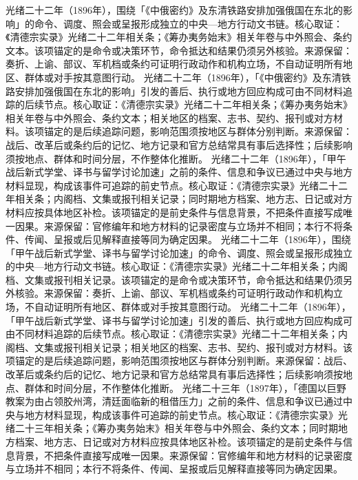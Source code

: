 光绪二十二年（1896年），围绕「《中俄密约》及东清铁路安排加强俄国在东北的影响」的命令、调度、照会或呈报形成独立的中央—地方行动文书链。核心取证：《清德宗实录》光绪二十二年相关条；《筹办夷务始末》相关年卷与中外照会、条约文本。该项锚定的是命令或决策环节，命令抵达和结果仍须另外核验。来源保留：奏折、上谕、部议、军机档或条约可证明行政动作和机构立场，不自动证明所有地区、群体或对手按其意图行动。
光绪二十二年（1896年），「《中俄密约》及东清铁路安排加强俄国在东北的影响」引发的善后、执行或地方回应构成可由不同材料追踪的后续节点。核心取证：《清德宗实录》光绪二十二年相关条；《筹办夷务始末》相关年卷与中外照会、条约文本；相关地区的档案、志书、契约、报刊或对方材料。该项锚定的是后续追踪问题，影响范围须按地区与群体分别判断。来源保留：战后、改革后或条约后的记忆、地方记录和官方总结常具有事后选择性；后续影响须按地点、群体和时间分层，不作整体化推断。
光绪二十二年（1896年），「甲午战后新式学堂、译书与留学讨论加速」之前的条件、信息和争议已通过中央与地方材料显现，构成该事件可追踪的前史节点。核心取证：《清德宗实录》光绪二十二年相关条；内阁档、文集或报刊相关记录；同时期地方档案、地方志、日记或对方材料应按具体地区补检。该项锚定的是前史条件与信息背景，不把条件直接写成唯一因果。来源保留：官修编年和地方材料的记录密度与立场并不相同；本行不将条件、传闻、呈报或后见解释直接等同为确定因果。
光绪二十二年（1896年），围绕「甲午战后新式学堂、译书与留学讨论加速」的命令、调度、照会或呈报形成独立的中央—地方行动文书链。核心取证：《清德宗实录》光绪二十二年相关条；内阁档、文集或报刊相关记录。该项锚定的是命令或决策环节，命令抵达和结果仍须另外核验。来源保留：奏折、上谕、部议、军机档或条约可证明行政动作和机构立场，不自动证明所有地区、群体或对手按其意图行动。
光绪二十二年（1896年），「甲午战后新式学堂、译书与留学讨论加速」引发的善后、执行或地方回应构成可由不同材料追踪的后续节点。核心取证：《清德宗实录》光绪二十二年相关条；内阁档、文集或报刊相关记录；相关地区的档案、志书、契约、报刊或对方材料。该项锚定的是后续追踪问题，影响范围须按地区与群体分别判断。来源保留：战后、改革后或条约后的记忆、地方记录和官方总结常具有事后选择性；后续影响须按地点、群体和时间分层，不作整体化推断。
光绪二十三年（1897年），「德国以巨野教案为由占领胶州湾，清廷面临新的租借压力」之前的条件、信息和争议已通过中央与地方材料显现，构成该事件可追踪的前史节点。核心取证：《清德宗实录》光绪二十三年相关条；《筹办夷务始末》相关年卷与中外照会、条约文本；同时期地方档案、地方志、日记或对方材料应按具体地区补检。该项锚定的是前史条件与信息背景，不把条件直接写成唯一因果。来源保留：官修编年和地方材料的记录密度与立场并不相同；本行不将条件、传闻、呈报或后见解释直接等同为确定因果。
